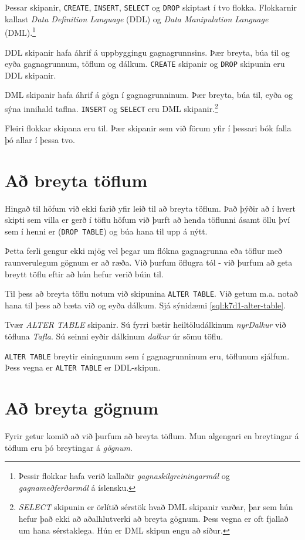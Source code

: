 Þessar skipanir, \verb|CREATE|, \verb|INSERT|, \verb|SELECT| og \verb|DROP| skiptast í tvo flokka. Flokkarnir kallast \emph{Data Definition Language} (DDL) og \emph{Data Manipulation Language} (DML).\footnote{Þessir flokkar hafa verið kallaðir \emph{gagnaskilgreiningarmál} og \emph{gagnameðferðarmál} á íslensku.}

DDL skipanir hafa áhrif á uppbyggingu gagnagrunnsins. Þær breyta, búa til og eyða gagnagrunnum, töflum og dálkum. \verb|CREATE| skipanir og \verb|DROP| skipunin eru DDL skipanir.

DML skipanir hafa áhrif á gögn í gagnagrunninum. Þær breyta, búa til, eyða og sýna innihald taflna. \verb|INSERT| og \verb|SELECT| eru DML skipanir.\footnote{\emph{SELECT} skipunin er örlítið sérstök hvað DML skipanir varðar, þar sem hún hefur það ekki að aðalhlutverki að breyta gögnum. Þess vegna er oft fjallað um hana sérstaklega. Hún er DML skipun engu að síður.}

Fleiri flokkar skipana eru til. Þær skipanir sem við förum yfir í þessari bók falla þó allar í þessa tvo.
\section{Að breyta töflum}
Hingað til höfum við ekki farið yfir leið til að breyta töflum. Það þýðir að í hvert skipti sem villa er gerð í töflu höfum við þurft að henda töflunni ásamt öllu því sem í henni er (\verb|DROP TABLE|) og búa hana til upp á nýtt.

Þetta ferli gengur ekki mjög vel þegar um flókna gagnagrunna eða töflur með raunverulegum gögnum er að ræða. Við þurfum öflugra tól - við þurfum að geta breytt töflu eftir að hún hefur verið búin til.

Til þess að breyta töflu notum við skipunina \verb|ALTER TABLE|. Við getum m.a. notað hana til þess að bæta við og eyða dálkum. Sjá sýnidæmi \ref{sql:k7d1-alter-table}.

\begin{example}
\caption[ALTER TABLE]{Tvær \emph{ALTER TABLE} skipanir. Sú fyrri bætir heiltöludálkinum \emph{nyrDalkur} við töfluna \emph{Tafla}. Sú seinni eyðir dálkinum \emph{dalkur} úr sömu töflu.}
\label{sql:k7d1-alter-table}
\centering
{}
\end{example}

\verb|ALTER TABLE| breytir einingunum sem í gagnagrunninum eru, töflunum sjálfum. Þess vegna er \verb|ALTER TABLE| er DDL-skipun.
\section{Að breyta gögnum}
Fyrir getur komið að við þurfum að breyta töflum. Mun algengari en breytingar á töflum eru þó breytingar á \emph{gögnum}.

